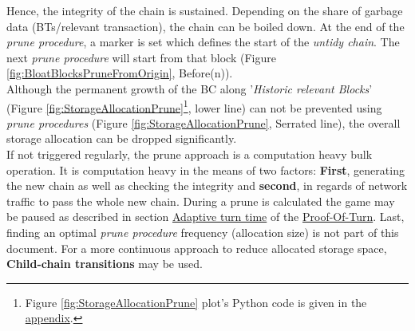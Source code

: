 Hence, the integrity of the chain is sustained.
Depending on the share of garbage data (\gls{BT}s/relevant transaction), the chain can be boiled down.
At the end of the \textit{prune procedure}, a marker is set which defines the start of the \textit{untidy chain}.
The next \textit{prune procedure} will start from that block (Figure \ref{fig:BloatBlocksPruneFromOrigin}, Before(n)). \\
Although the permanent growth of the \gls{BC} along '\textit{Historic relevant Blocks}'
(Figure \ref{fig:StorageAllocationPrune}\footnote{\hspace{0.1cm}Figure \ref{fig:StorageAllocationPrune}
	plot's Python code is given in the \hyperref[script:StorageAllocationPPSC]{appendix}.}, lower line)
can not be prevented using \textit{prune procedures} (Figure \ref{fig:StorageAllocationPrune}, Serrated line), the overall storage allocation can be dropped significantly. \\
If not triggered regularly, the prune approach is a computation heavy bulk operation.
It is computation heavy in the means of two factors:
\textbf{First}, generating the new chain as well as checking the integrity and \textbf{second}, in regards of network traffic to pass the whole new chain.
During a prune is calculated the game may be paused as described in section \hyperref[sec:PeerFluctuation]{Adaptive turn time} of the \hyperref[chap:PoT]{Proof-Of-Turn}.
Last, finding an optimal \textit{prune procedure} frequency (allocation size) is not part of this document.
For a more continuous approach to reduce allocated storage space, \textbf{Child-chain transitions} may be used.



